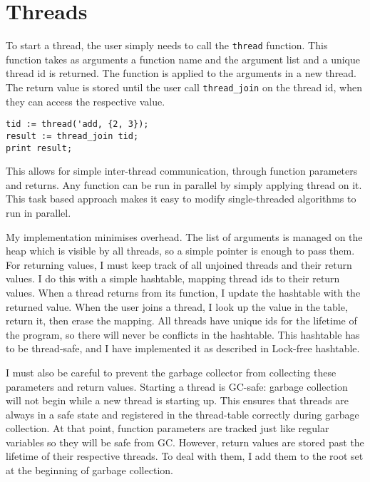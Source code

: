 
\section{Threads}
\label{sec:threads}

To start a thread, the user
simply needs to call the \texttt{thread} function. This function takes as arguments a function name and the argument list
and a unique thread id is returned. The function is applied to the arguments in a new thread. The return value
is stored until the user call \texttt{thread\_join} on the thread id, when they can access the respective value.

\begin{verbatim}
tid := thread('add, {2, 3});
result := thread_join tid;
print result;
\end{verbatim}

This allows for simple inter-thread communication, through function parameters and returns. Any function can
be run in parallel by simply applying thread on it. This task based approach makes it easy to modify
single-threaded algorithms to run in parallel.

My implementation minimises overhead. The list of arguments is managed on the heap which is visible by all
threads, so a simple pointer is enough to pass them. For returning values, I must keep track of all
unjoined threads and their return values. I do this with a simple hashtable, mapping thread ids to their
return values. When a thread returns from its function, I update the hashtable with the returned value.
When the user joins a thread, I look up the value in the table, return it, then erase the mapping. All threads
have unique ids for the lifetime of the program, so there will never be conflicts in the hashtable.
This hashtable has to be thread-safe, and I have implemented it as described in Lock-free hashtable.

I must also be careful to prevent the garbage collector from collecting these parameters and return values.
Starting a thread is GC-safe: garbage collection will not begin while a new thread is starting up. This ensures
that threads are always in a safe state and registered in the thread-table correctly during garbage collection.
At that point, function parameters are tracked just like regular variables so they will be safe from GC.
However, return values are stored past the lifetime of their respective threads. To deal with them, I add them
to the root set at the beginning of garbage collection.

